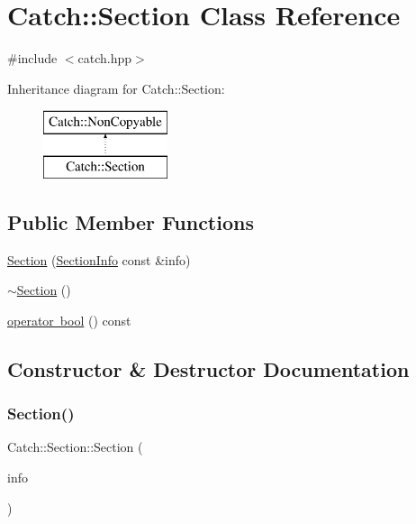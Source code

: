 \hypertarget{class_catch_1_1_section}{}\section{Catch\+:\+:Section Class Reference}
\label{class_catch_1_1_section}


{\ttfamily \#include $<$catch.\+hpp$>$}

Inheritance diagram for Catch\+:\+:Section\+:\begin{figure}[H]
\begin{center}
\leavevmode
\includegraphics[height=2.000000cm]{class_catch_1_1_section}
\end{center}
\end{figure}
\subsection*{Public Member Functions}
\begin{DoxyCompactItemize}
\item 
\mbox{\hyperlink{class_catch_1_1_section_a68fd4e51e8981aaa7ddb00d8a6abd099}{Section}} (\mbox{\hyperlink{struct_catch_1_1_section_info}{Section\+Info}} const \&info)
\item 
\mbox{\hyperlink{class_catch_1_1_section_aa1422edd68a77aa578b5cc6b8b69f86f}{$\sim$\+Section}} ()
\item 
\mbox{\hyperlink{class_catch_1_1_section_a0632b804dcea1417a2970620a9742eb3}{operator bool}} () const
\end{DoxyCompactItemize}


\subsection{Constructor \& Destructor Documentation}
\mbox{\label{class_catch_1_1_section_a68fd4e51e8981aaa7ddb00d8a6abd099}} 
\subsubsection{\texorpdfstring{Section()}{Section()}}
{\footnotesize\ttfamily Catch\+::\+Section\+::\+Section (\begin{DoxyParamCaption}\item[{\mbox{\hyperlink{struct_catch_1_1_section_info}{Section\+Info}} const \&}]{info }\end{DoxyParamCaption})}

